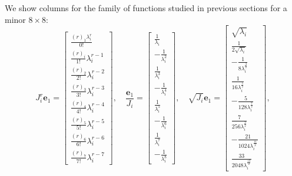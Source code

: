 We show columns for the family of functions studied in previous sections
for a minor $8\times8$:
\begin{displaymath}
J_{i}^{r} \boldsymbol{e}_{1}        = \left[\begin{matrix}\frac{{\left(r\right)}_{1} \lambda_{i}^{r}}{0!}\\\frac{{\left(r\right)}_{i}}{1!} \lambda_{i}^{r - 1}\\\frac{{\left(r\right)}_{2}}{2!} \lambda_{i}^{r - 2}\\\frac{{\left(r\right)}_{3}}{3!} \lambda_{i}^{r - 3}\\\frac{{\left(r\right)}_{4}}{4!} \lambda_{i}^{r - 4}\\\frac{{\left(r\right)}_{5}}{5!} \lambda_{i}^{r - 5}\\\frac{{\left(r\right)}_{6}}{6!} \lambda_{i}^{r - 6}\\\frac{{\left(r\right)}_{7}}{7!} \lambda_{i}^{r - 7}\end{matrix}\right],\quad
\frac{\boldsymbol{e}_{1}}{J_{i}}    = \left[\begin{matrix}\frac{1}{\lambda_{i}}\\- \frac{1}{\lambda_{i}^{2}}\\\frac{1}{\lambda_{i}^{3}}\\- \frac{1}{\lambda_{i}^{4}}\\\frac{1}{\lambda_{i}^{5}}\\- \frac{1}{\lambda_{i}^{6}}\\\frac{1}{\lambda_{i}^{7}}\\- \frac{1}{\lambda_{i}^{8}}\end{matrix}\right],\quad
\sqrt{J_{i}} \boldsymbol{e}_{1}     = \left[\begin{matrix}\sqrt{\lambda_{i}}\\\frac{1}{2 \sqrt{\lambda_{i}}}\\- \frac{1}{8 \lambda_{i}^{\frac{3}{2}}}\\\frac{1}{16 \lambda_{i}^{\frac{5}{2}}}\\- \frac{5}{128 \lambda_{i}^{\frac{7}{2}}}\\\frac{7}{256 \lambda_{i}^{\frac{9}{2}}}\\- \frac{21}{1024 \lambda_{i}^{\frac{11}{2}}}\\\frac{33}{2048 \lambda_{i}^{\frac{13}{2}}}\end{matrix}\right],
\end{displaymath}
